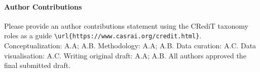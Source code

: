 \documentclass[journal=eds]{CAM-MODERN}%
\theoremstyle{definition}
\numberwithin{equation}{section}
\begin{document}
\begin{Backmatter}
\paragraph{Author Contributions}
Please provide an author contributions statement using the CRediT taxonomy roles as a guide {\verb+\url{https://www.casrai.org/credit.html}+}. Conceptualization: A.A; A.B. Methodology: A.A; A.B. Data curation: A.C. Data visualisation: A.C. Writing original draft: A.A; A.B. All authors approved the final submitted draft.

\printbibliography

\end{Backmatter}
\end{document}
